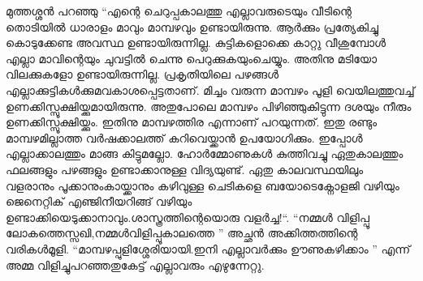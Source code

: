 മുത്തശ്ശൻ പറഞ്ഞു “എന്റെ ചെറുപ്പകാലത്തു എല്ലാവരുടെയും വീടിന്റെ തൊടിയിൽ ധാരാളം മാവും മാമ്പഴവും ഉണ്ടായിരുന്നു. ആർക്കും പ്രത്യേകിച്ചു കൊടുക്കേണ്ട അവസ്ഥ ഉണ്ടായിരുന്നില്ല. കുട്ടികളൊക്കെ കാറ്റു വീശുമ്പോൾ എല്ലാ മാവിന്റെയും ചുവട്ടിൽ ചെന്നു പെറുക്കുകയുംചെയ്യും. അതിനു മടിയോ വിലക്കുകളോ ഉണ്ടായിരുന്നില്ല. പ്രകൃതിയിലെ പഴങ്ങൾ എല്ലാക്കുട്ടികൾക്കുമവകാശപ്പെട്ടതാണ്‌. മിച്ചം വരുന്ന മാമ്പഴം പൂളി വെയിലത്തുവച്ച് ഉണക്കിസ്സൂക്ഷിയ്ക്കുമായിരുന്നു. അതുപോലെ മാമ്പഴം പിഴിഞ്ഞുകിട്ടുന്ന ദശയും നീരും ഉണക്കിസ്സൂക്ഷിയ്ക്കും. ഇതിനു മാമ്പഴത്തിര എന്നാണ്‌ പറയുന്നത്. ഇതു രണ്ടും മാമ്പഴമില്ലാത്ത വർഷക്കാലത്ത് കറിവെയ്ക്കാൻ ഉപയോഗിക്കും. ഇപ്പോൾ എല്ലാക്കാലത്തും മാങ്ങ കിട്ടുമല്ലോ. ഹോർമ്മോണുകൾ കുത്തിവച്ചു ഏതുകാലത്തും ഫലങ്ങളും പഴങ്ങളും ഉണ്ടാക്കാനുള്ള വിദ്യയുണ്ട്. ഏതു കാലവസ്ഥയിലും വളരാനും പൂക്കാനുംകായ്ക്കാനും കഴിവുള്ള ചെടികളെ ബയോടെക്നോളജി വഴിയും ജെനെറ്റിക് എഞ്ജിനീയറിങ്ങ് വഴിയും ഉണ്ടാക്കിയെടുക്കാനാവും.ശാസ്ത്രത്തിന്റെയൊരു വളർച്ച!“.
\hspace{2em}“നമ്മൾ വിളിപ്പൂ ലോകത്തെസ്സഖി,നമ്മൾവിളിപ്പൂകാലത്തെ ”
അച്ഛൻ അക്കിത്തത്തിന്റെ വരികൾമൂളി. “മാമ്പഴപ്പുളിശ്ശേരിയായി.ഇനി എല്ലാവർക്കും ഊണുകഴിക്കാം ” എന്ന് അമ്മ വിളിച്ചുപറഞ്ഞതുകേട്ട് എല്ലാവരും എഴുന്നേറ്റു. 
